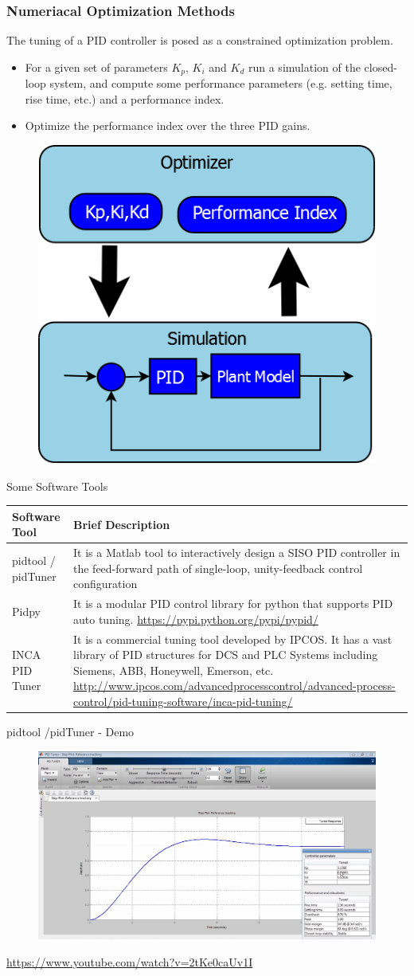 \begin{frame}
	\small{
	\frametitle{Numeriacal Optimization Methods}
	The tuning of a PID controller is posed as a constrained optimization problem. 
	\begin{itemize}
			\item For a given set of parameters $K_p$, $K_i$ and $K_d$ run a simulation of the closed-loop system, and compute some performance parameters (e.g. setting time, rise time, etc.) and a performance index.
			\item Optimize the performance index over the three PID gains.
	\end{itemize}}
\begin{figure}

\includegraphics[width=0.3\linewidth]{img/PID_1}
\end{figure}

	
\end{frame}
\begin{frame}{Some Software Tools}
	\small{
	\begin{tabular}{|p{3cm}|p{7cm}|}
		\hline Software Tool  & Brief Description  \\ 
		\hline pidtool / pidTuner
		 & It is a Matlab tool to interactively design a SISO PID controller in the feed-forward path of single-loop, unity-feedback control configuration \\ 
		\hline Pidpy
		 & It is a modular PID control library for python that supports PID auto tuning. \url{https://pypi.python.org/pypi/pypid/}
		  \\ 
		\hline INCA PID Tuner
		 & It is a commercial tuning tool developed by IPCOS. It has a vast library of PID structures for DCS and PLC  Systems including Siemens, ABB, Honeywell, Emerson, etc. \url{http://www.ipcos.com/advancedprocesscontrol/advanced-process-control/pid-tuning-software/inca-pid-tuning/}
		   \\ 
		\hline 
	\end{tabular}}
\end{frame}
\begin{frame}{pidtool /pidTuner - Demo}
	\begin{figure}
\centering
\includegraphics[width=0.7\linewidth]{img/pid_tool}

\end{figure}
\url{https://www.youtube.com/watch?v=2tKe0caUv1I}
\end{frame}
